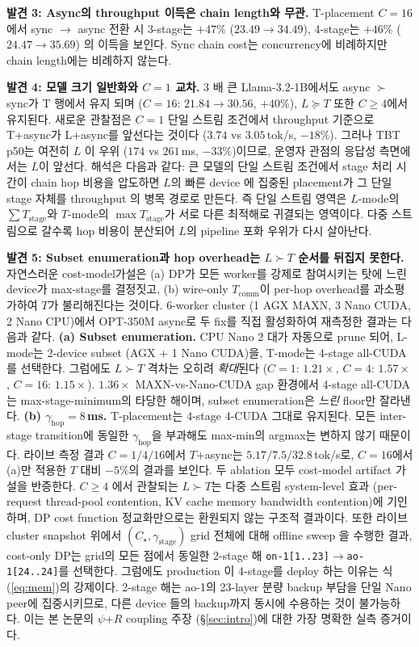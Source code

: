 \documentclass[10pt,twocolumn,a4paper]{article}
\begin{document}
\textbf{발견 3: Async의 throughput 이득은 chain length와 무관.}
T-placement $C\!=\!16$에서 sync $\to$ async 전환 시 3-stage는
$+47\%$ ($23.49 \to 34.49$), 4-stage는 $+46\%$ ($24.47 \to 35.69$)
의 이득을 보인다. Sync chain cost는 concurrency에 비례하지만
chain length에는 비례하지 않는다.

\textbf{발견 4: 모델 크기 일반화와 $C\!=\!1$ 교차.}
3 배 큰 Llama-3.2-1B에서도 async $\succ$ sync가 T 행에서 유지
되며 ($C\!=\!16$: $21.84 \to 30.56$, $+40\%$), $L \succeq T$ 또한
$C\!\geq\!4$에서 유지된다. 새로운 관찰점은 $C\!=\!1$ 단일 스트림
조건에서 throughput 기준으로 T+async가 L+async를 앞선다는 것이다
($3.74$ vs $3.05$\,tok/s, $-18\%$). 그러나 TBT p50는 여전히 $L$
이 우위 ($174$ vs $261$\,ms, $-33\%$)이므로, 운영자 관점의
응답성 측면에서는 $L$이 앞선다. 해석은 다음과 같다: 큰
모델의 단일 스트림 조건에서 stage 처리 시간이 chain hop 비용을
압도하면 $L$의 빠른 device 에 집중된 placement가 그 단일
stage 자체를 throughput 의 병목 경로로 만든다.
즉 단일 스트림 영역은 $L$-mode의 $\sum T_{\text{stage}}$와
$T$-mode의 $\max T_{\text{stage}}$가 서로 다른 최적해로
귀결되는 영역이다. 다중 스트림으로 갈수록 hop 비용이 분산되어
$L$의 pipeline 포화 우위가 다시 살아난다.

\textbf{발견 5: Subset enumeration과 hop overhead는 $L \succ T$
순서를 뒤집지 못한다.} 자연스러운 cost-model가설은 (a) DP가 모든
worker를 강제로 참여시키는 탓에 느린 device가 max-stage를
결정짓고, (b) wire-only $T_{\mathrm{comm}}$이 per-hop overhead를
과소평가하여 $T$가 불리해진다는 것이다. 6-worker cluster (1 AGX MAXN,
3 Nano CUDA, 2 Nano CPU)에서 OPT-350M async로 두 fix를 직접
활성화하여 재측정한 결과는 다음과 같다.
\textbf{(a) Subset enumeration.} CPU Nano 2 대가 자동으로 prune 되어,
L-mode는 2-device subset (AGX + 1 Nano CUDA)을, T-mode는
4-stage all-CUDA를 선택한다. 그럼에도 $L\!\succ\!T$ 격차는 오히려
\emph{확대}된다 ($C\!=\!1$: $1.21\times$, $C\!=\!4$: $1.57\times$,
$C\!=\!16$: $1.15\times$). $1.36\times$ MAXN-vs-Nano-CUDA gap 환경에서
4-stage all-CUDA는 max-stage-minimum의 타당한 해이며, subset
enumeration은 \emph{느린} floor만 잘라낸다.
\textbf{(b) $\gamma_{\mathrm{hop}}\!=\!8$\,ms.} T-placement는 4-stage
4-CUDA 그대로 유지된다. 모든 inter-stage transition에 동일한
$\gamma_{\mathrm{hop}}$을 부과해도 max-min의 argmax는 변하지
않기 때문이다. 라이브 측정 결과 $C\!=\!1/4/16$에서 $T$+async는
$5.17 / 7.5 / 32.8$\,tok/s로, $C\!=\!16$에서 (a)만 적용한 $T$
대비 $-5\%$의 결과를 보인다.
두 ablation 모두 cost-model artifact 가설을 반증한다. $C\!\geq\!4$
에서 관찰되는 $L\!\succ\!T$는 다중 스트림 system-level 효과
(per-request thread-pool contention, KV cache memory bandwidth
contention)에 기인하며, DP cost function 정교화만으로는 환원되지
않는 구조적 결과이다. 또한 라이브 cluster snapshot 위에서
$(C_\star, \gamma_{\mathrm{stage}})$ grid 전체에 대해 offline sweep
을 수행한 결과, cost-only DP는 grid의 모든 점에서 동일한 2-stage
해 \texttt{on-1[1..23]$\to$ao-1[24..24]}를 선택한다. 그럼에도 production
이 4-stage를 deploy 하는 이유는 식 (\ref{eq:mem})의 강제이다.
2-stage 해는 ao-1의 23-layer 분량 backup 부담을 단일 Nano peer에
집중시키므로, 다른 device 들의 backup까지 동시에 수용하는 것이
불가능하다. 이는 본 논문의 $\psi$+$R$ coupling 주장
(\S\ref{sec:intro})에 대한 가장 명확한 실측 증거이다.
\end{document}

